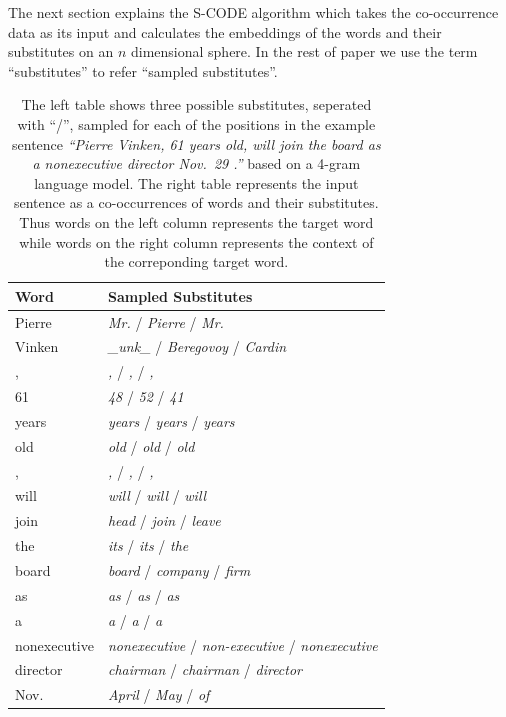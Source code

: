The next section explains the S-CODE algorithm which takes the
co-occurrence data as its input and calculates the embeddings of the
words and their substitutes on an $n$ dimensional sphere.  In the rest
of paper we use the term ``substitutes'' to refer ``sampled
substitutes''.

\begin{table}[h]
\caption{The left table shows three possible substitutes, seperated
  with ``/'', sampled for each of the positions in the example
  sentence \textit{``Pierre Vinken, 61 years old, will join the board
    as a nonexecutive director Nov.~29 .''} based on a 4-gram language
  model.  The right table represents the input sentence as a
  co-occurrences of words and their substitutes.  Thus words on the
  left column represents the target word while words on the right
  column represents the context of the correponding target word.}
\begin{tabular}{|ll|} \hline
\textbf{Word} & \textbf{Sampled Substitutes}\\
\hline
Pierre & \textit{Mr.}  / \textit{Pierre} /  \textit{Mr.}\\
Vinken & \textit{\_unk\_} / \textit{Beregovoy} / \textit{Cardin}\\
, & \textit{,} / \textit{,} / \textit{,}\\
61 & \textit{48} / \textit{52} / \textit{41}\\
years & \textit{years} /  \textit{years} /  \textit{years}\\
old & \textit{old} /  \textit{old} /  \textit{old}\\
, & \textit{,} /  \textit{,} /  \textit{,}\\
will & \textit{will} /  \textit{will} /  \textit{will}\\
join & \textit{head} /  \textit{join} /  \textit{leave}\\
the  & \textit{its} /  \textit{its} /  \textit{the}\\
board & \textit{board} /  \textit{company} / \textit{firm}\\
as & \textit{as} / \textit{as} / \textit{as}\\
a & \textit{a} / \textit{a} / \textit{a}\\
nonexecutive & \textit{nonexecutive} / \textit{non-executive} / \textit{nonexecutive}\\
director & \textit{chairman} / \textit{chairman} / \textit{director}\\
Nov. & \textit{April} / \textit{May} / \textit{of}\\

\end{tabular}
\end{table}
